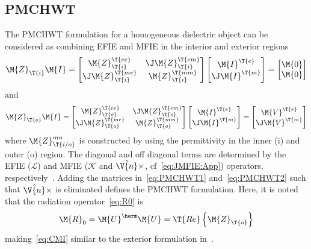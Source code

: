 \documentclass[journal]{IEEEtran}
\providecommand{\Umat}{\M{U}} %
\begin{document}
\subsection{PMCHWT}
The PMCHWT formulation for a homogeneous dielectric object can be considered as combining EFIE and MFIE in the interior and exterior regions
\begin{equation}
    \M{Z}_{\T{i}}\M{I}
    =
    \begin{bmatrix}
     \M{Z}_{\T{i}}^{\T{ee}} & \J\M{Z}_{\T{i}}^{\T{em}}\\
     \J\M{Z}_{\T{i}}^{\T{me}} & \M{Z}_{\T{i}}^{\T{mm}}
    \end{bmatrix}
    \begin{bmatrix}
     \M{I}^{\T{e}} \\ \J\M{I}^{\T{m}} 
    \end{bmatrix}
    = \begin{bmatrix}
     \M{0} \\ \M{0} 
    \end{bmatrix}
    \label{eq:PMCHWT1}
\end{equation}
and
\begin{equation}
    \M{Z}_{\T{o}}\M{I}
    =
    \begin{bmatrix}
     \M{Z}_{\T{o}}^{\T{ee}} & \J\M{Z}_{\T{o}}^{\T{em}}\\
     \J\M{Z}_{\T{o}}^{\T{me}} & \M{Z}_{\T{o}}^{\T{mm}}
    \end{bmatrix}
    \begin{bmatrix}
     \M{I}^{\T{e}} \\ \J\M{I}^{\T{m}} 
    \end{bmatrix}
    = \begin{bmatrix}
     \M{V}^{\T{e}} \\ \J\M{V}^{\T{m}}
    \end{bmatrix}
    \label{eq:PMCHWT2}
\end{equation}
where $\M{Z}_{\T{i/o}}^{mn}$ is constructed by using the permittivity in the inner (i) and outer (o) region. The diagonal and off diagonal terms are determined by the EFIE ($\mathcal{L}$) and MFIE ($\mathcal{K}$ and $\hat{\V{n}}\times$, cf~\eqref{eq:JMFIE:App}) operators, respectively~\cite{Jin_TheoryAndComputationOfElectromagneticFields,ChewTongHu_IntegralEquationMethodsForElectromagneticAndElasticWaves}. Adding the matrices in~\eqref{eq:PMCHWT1} and~\eqref{eq:PMCHWT2} such that $\hat{\V{n}}\times$ is eliminated defines the PMCHWT formulation. Here, it is noted that the radiation operator~\eqref{eq:R0} is
\begin{equation}
    \M{R}_0 = \Umat^\herm \Umat
    = \T{Re} \left\{\M{Z}_\T{o} \right\}
\end{equation}
making~\eqref{eq:CMI} similar to the exterior formulation in~\cite{YlaOijala_PMCHWTBasedCharacteristicModeFormulationsforMaterialBodies}.  
\end{document}
